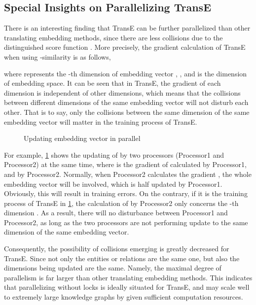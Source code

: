 \documentclass[sigconf]{acmart}
\begin{document}
\subsection{Special Insights on Parallelizing TransE}
There is an interesting finding that TransE can be further parallelized than other translating embedding methods, since there are less collisions due to the distinguished score function . More precisely, the gradient calculation of TransE when using -similarity is as follows, 

where  represents the -th dimension of embedding vector , , and  is the dimension of embedding space. It can be seen that in TransE, the gradient of each dimension is independent of other dimensions, which means that the collisions between different dimensions of the same embedding vector will not disturb each other. That is to say, only the collisions between the  same dimension of the same embedding vector will matter in the training process of TransE.

\begin{figure}[htbp]
\centering
{}
\vspace{-7pt}
\caption{Updating embedding vector  in parallel}
\label{multithread2}
\vspace{-7pt}
\end{figure}

For example, \figurename \ref{multithread2} shows the updating of  by two processors (Processor1 and Processor2) at the same time, where  is the gradient of  calculated by Processor1, and  by Processor2.
Normally, when Processor2 calculates the gradient , the whole embedding vector  will be involved, which  is half updated by Processor1. Obviously, this will result in training errors.   
On the contrary, if it is the training process of TransE in \figurename \ref{multithread2}, the calculation of  by Processor2 only concerns the -th dimension . As a result, there will no disturbance between Processor1 and Processor2, as long as the two processors are not performing update to the same dimension of the same embedding vector.


Consequently, the possibility of collisions emerging is greatly decreased for TransE. Since not only the entities or relations are the same one, but also the dimensions being updated are the same. Namely, the maximal degree of parallelism is far larger than other translating embedding methods.
This indicates that parallelizing without locks is ideally situated for TransE, and may scale well to extremely large knowledge graphs by given sufficient computation resources.
\end{document}
